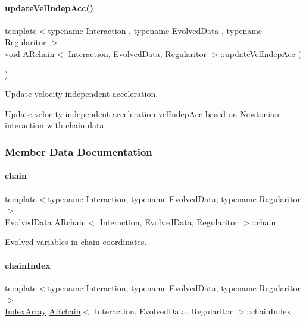 \paragraph{\texorpdfstring{update\+Vel\+Indep\+Acc()}{updateVelIndepAcc()}}
{\footnotesize\ttfamily template$<$typename Interaction , typename Evolved\+Data , typename Regularitor $>$ \\
void \mbox{\hyperlink{class_a_rchain}{A\+Rchain}}$<$ Interaction, Evolved\+Data, Regularitor $>$\+::update\+Vel\+Indep\+Acc (\begin{DoxyParamCaption}{ }\end{DoxyParamCaption})\hspace{0.3cm}{\ttfamily [private]}}



Update velocity independent acceleration. 

Update velocity independent acceleration \textquotesingle{}vel\+Indep\+Acc\textquotesingle{} based on \mbox{\hyperlink{class_newtonian}{Newtonian}} interaction with chain data. 

\subsubsection{Member Data Documentation}
\mbox{\label{class_a_rchain_af7780024bfc1beca5f5622086b909db2}} 
\paragraph{\texorpdfstring{chain}{chain}}
{\footnotesize\ttfamily template$<$typename Interaction, typename Evolved\+Data, typename Regularitor$>$ \\
Evolved\+Data \mbox{\hyperlink{class_a_rchain}{A\+Rchain}}$<$ Interaction, Evolved\+Data, Regularitor $>$\+::chain\hspace{0.3cm}{\ttfamily [private]}}



Evolved variables in chain coordinates. 

\mbox{\label{class_a_rchain_a0691e6612b661e329f1fc72d4cb7c895}} 
\paragraph{\texorpdfstring{chain\+Index}{chainIndex}}
{\footnotesize\ttfamily template$<$typename Interaction, typename Evolved\+Data, typename Regularitor$>$ \\
\mbox{\hyperlink{class_a_rchain_aae40d4b5881eecfc960814f9e368215d}{Index\+Array}} \mbox{\hyperlink{class_a_rchain}{A\+Rchain}}$<$ Interaction, Evolved\+Data, Regularitor $>$\+::chain\+Index\hspace{0.3cm}{\ttfamily [private]}}



